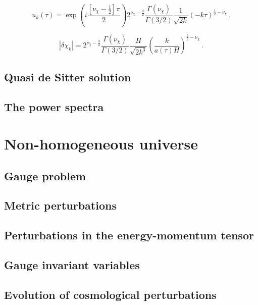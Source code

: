 \begin{equation}
u_k(\tau) = \exp(i\frac{[\nu_{\chi}-\frac{1}{2}]\pi}{2}) 2^{\nu_{\chi}-\frac{3}{2}} \frac{\Gamma(\nu_{\chi})}{\Gamma(3/2)}\frac{1}{\sqrt{2k}}(-k\tau)^{\frac{1}{2}-\nu_{\chi}}\, .
\label{equation:3.2.37}
\end{equation}

\begin{equation}
| \delta \chi_k | = 2^{\nu_{\chi}-\frac{3}{2}} \frac{\Gamma(\nu_{\chi})}{\Gamma(3/2)} \frac{H}{\sqrt{2k^3}} \left ( \frac{k}{a(\tau) H} \right )^{\frac{3}{2}-\nu_{\chi}}\, .
\label{equation:3.2.38}
\end{equation}

\subsection{Quasi de Sitter solution}
\label{subsection:3.2.2}



\subsection{The power spectra}
\label{subsection:3.2.3}

\section{Non-homogeneous universe}
\label{section:3.3}

\subsection{Gauge problem}
\label{subsection:3.3.1}

\subsection{Metric perturbations}
\label{subsection:3.3.2}

\subsection{Perturbations in the energy-momentum tensor}
\label{subsection:3.3.3}

\subsection{Gauge invariant variables}
\label{subsection:3.3.4}

\subsection{Evolution of cosmological perturbations}
\label{subsection:3.3.5}

